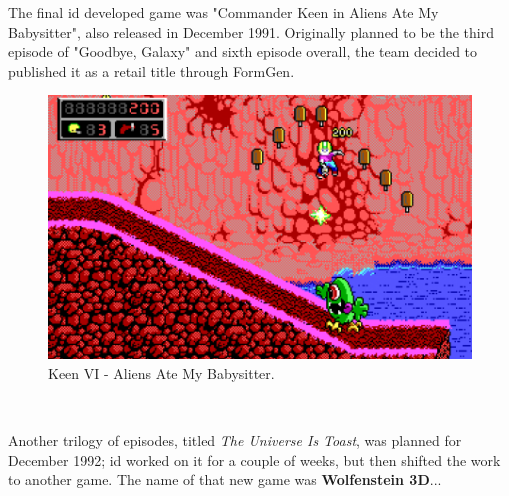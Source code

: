 \documentclass[book.tex]{subfiles}
\begin{document}
\par
The final id developed game was "Commander Keen in Aliens Ate My Babysitter", also released in December 1991. Originally planned to be the third episode of "Goodbye, Galaxy" and sixth episode overall, the team decided to published it as a retail title through FormGen.\\

\begin{figure}[H]
  \centering
  \includegraphics[width=.95\textwidth]{screenshots_300dpi/keen3_1.png}
  \caption{Keen VI - Aliens Ate My Babysitter.}
\label{fig:keen_1}
\end{figure}


\\

\par
Another trilogy of episodes, titled \textit{The Universe Is Toast}, was planned for December 1992; id worked on it for a couple of weeks, but then shifted the work to another game. The name of that new game was \textbf{Wolfenstein 3D}...
\end{document}
